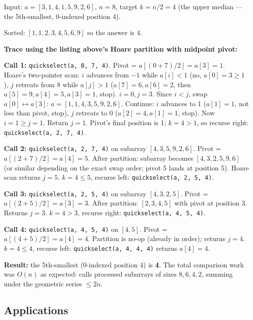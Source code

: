 \documentclass[11pt]{article}
\begin{document}
\begin{examplebox}
Input: $a = [3, 1, 4, 1, 5, 9, 2, 6]$, $n = 8$, target
$k = n/2 = 4$ (the upper median --- the 5th-smallest, 0-indexed
position 4).

Sorted: $[1, 1, 2, 3, 4, 5, 6, 9]$ so the answer is 4.

\textbf{Trace using the listing above's Hoare partition with
midpoint pivot:}

\textbf{Call 1:} \texttt{quickselect(a, 0, 7, 4)}.
Pivot = $a[(0+7)/2] = a[3] = 1$. Hoare's two-pointer scan: $i$
advances from $-1$ while $a[i] < 1$ (no, $a[0] = 3 \ge 1$), $j$
retreats from $8$ while $a[j] > 1$ ($a[7] = 6, a[6] = 2$, then
$a[5] = 9, a[4] = 5, a[3] = 1$, stop). $i = 0, j = 3$. Since
$i < j$, swap $a[0] \leftrightarrow a[3]$:
$a = [1, 1, 4, 3, 5, 9, 2, 6]$. Continue: $i$ advances to 1
($a[1] = 1$, not less than pivot, stop), $j$ retreats to 0
($a[2] = 4, a[1] = 1$, stop). Now $i = 1 \ge j = 1$. Return
$j = 1$. Pivot's final position is 1; $k = 4 > 1$, so recurse
right: \texttt{quickselect(a, 2, 7, 4)}.

\textbf{Call 2:} \texttt{quickselect(a, 2, 7, 4)} on subarray
$[4, 3, 5, 9, 2, 6]$. Pivot = $a[(2+7)/2] = a[4] = 5$. After
partition: subarray becomes $[4, 3, 2, 5, 9, 6]$ (or similar
depending on the exact swap order; pivot 5 lands at position 5).
Hoare scan returns $j = 5$. $k = 4 \le 5$, recurse left:
\texttt{quickselect(a, 2, 5, 4)}.

\textbf{Call 3:} \texttt{quickselect(a, 2, 5, 4)} on subarray
$[4, 3, 2, 5]$. Pivot = $a[(2+5)/2] = a[3] = 3$. After partition:
$[2, 3, 4, 5]$ with pivot at position 3. Returns $j = 3$.
$k = 4 > 3$, recurse right: \texttt{quickselect(a, 4, 5, 4)}.

\textbf{Call 4:} \texttt{quickselect(a, 4, 5, 4)} on $[4, 5]$.
Pivot = $a[(4+5)/2] = a[4] = 4$. Partition is no-op
(already in order); returns $j = 4$. $k = 4 \le 4$, recurse
left: \texttt{quickselect(a, 4, 4, 4)} returns $a[4] = 4$.

\textbf{Result:} the 5th-smallest (0-indexed position 4) is
\textbf{4}. The total comparison work was $O(n)$ as expected:
calls processed subarrays of sizes $8, 6, 4, 2$, summing under
the geometric series $\le 2n$.
\end{examplebox}

\subsection*{Applications}
\end{document}
